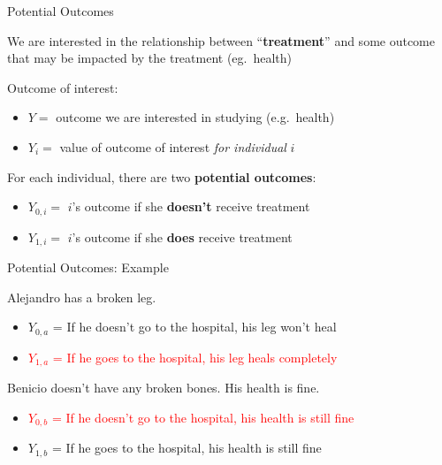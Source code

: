 \documentclass[10pt,xcolor=table,ignorenonframetext,handout,aspectratio=169]{beamer}
\newlength{\wideitemsep}
\let\olditem\item
\renewcommand{\item}{\setlength{\itemsep}{\wideitemsep}\olditem}
\begin{document}
\begin{frame}{Potential Outcomes}

\medskip
We are interested in the relationship between ``\textbf{treatment}'' and 
some outcome that may be impacted by the treatment (eg.~health)

\pause
\medskip
\medskip
Outcome of interest:

\medskip
\begin{itemize}
	
	\item $Y = $ outcome we are interested in studying  (e.g.~health)
	
	\item $Y_i = $ value of outcome of interest \emph{for individual} $i$
	
\end{itemize}

\pause
\medskip
\medskip
For each individual, there are two \textbf{potential outcomes}:

\medskip
\begin{itemize}
	
	\item $Y_{0,i} = $ $i$'s outcome if she \textbf{doesn't} receive treatment
	
	\item $Y_{1,i} = $ $i$'s outcome if she \textbf{does} receive treatment
	
\end{itemize}

\end{frame}


\begin{frame}{Potential Outcomes:  Example}

\medskip

Alejandro has a broken leg.

\medskip
\begin{itemize}
	
	\item $Y_{0,a}$ = If he doesn't go to the hospital, his leg won't heal
	
	\item \textcolor{red}{$Y_{1,a}$ = If he goes to the hospital, his leg heals completely}
	
\end{itemize}

\pause
\medskip
\medskip
Benicio doesn't have any broken bones.  His health is fine.

\medskip
\begin{itemize}
	
	\item \textcolor{red}{$Y_{0,b}$ = If he doesn't go to the hospital, his health is still fine}
	
	\item $Y_{1,b}$ = If he goes to the hospital, his health is still fine
	
\end{itemize}

\end{frame}
\end{document}
